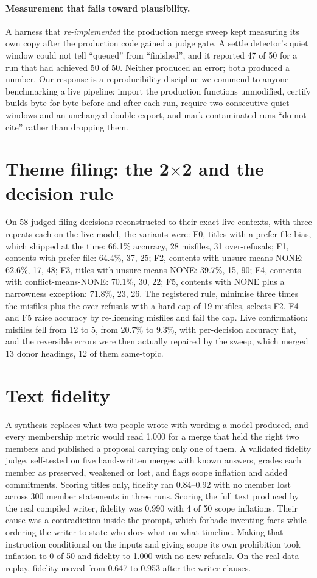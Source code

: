 \documentclass{article}
\begin{document}
\paragraph{Measurement that fails toward plausibility.} A harness that \emph{re-implemented} the production merge sweep kept measuring its own copy after the production code gained a judge gate. A settle detector's quiet window could not tell ``queued'' from ``finished'', and it reported 47 of 50 for a run that had achieved 50 of 50. Neither produced an error; both produced a number. Our response is a reproducibility discipline we commend to anyone benchmarking a live pipeline: import the production functions unmodified, certify builds byte for byte before and after each run, require two consecutive quiet windows and an unchanged double export, and mark contaminated runs ``do not cite'' rather than dropping them.

\section{Theme filing: the 2$\times$2 and the decision rule}
\label{app:filing}
On 58 judged filing decisions reconstructed to their exact live contexts, with three repeats each on the live model, the variants were: F0, titles with a prefer-file bias, which shipped at the time: 66.1\% accuracy, 28 misfiles, 31 over-refusals; F1, contents with prefer-file: 64.4\%, 37, 25; F2, contents with unsure-means-NONE: 62.6\%, 17, 48; F3, titles with unsure-means-NONE: 39.7\%, 15, 90; F4, contents with conflict-means-NONE: 70.1\%, 30, 22; F5, contents with NONE plus a narrowness exception: 71.8\%, 23, 26. The registered rule, minimise three times the misfiles plus the over-refusals with a hard cap of 19 misfiles, selects F2. F4 and F5 raise accuracy by re-licensing misfiles and fail the cap. Live confirmation: misfiles fell from 12 to 5, from 20.7\% to 9.3\%, with per-decision accuracy flat, and the reversible errors were then actually repaired by the sweep, which merged 13 donor headings, 12 of them same-topic.

\section{Text fidelity}
\label{app:fidelity}
A synthesis replaces what two people wrote with wording a model produced, and every membership metric would read 1.000 for a merge that held the right two members and published a proposal carrying only one of them. A validated fidelity judge, self-tested on five hand-written merges with known answers, grades each member as preserved, weakened or lost, and flags scope inflation and added commitments. Scoring titles only, fidelity ran 0.84--0.92 with no member lost across 300 member statements in three runs. Scoring the full text produced by the real compiled writer, fidelity was 0.990 with 4 of 50 scope inflations. Their cause was a contradiction inside the prompt, which forbade inventing facts while ordering the writer to state who does what on what timeline. Making that instruction conditional on the inputs and giving scope its own prohibition took inflation to 0 of 50 and fidelity to 1.000 with no new refusals. On the real-data replay, fidelity moved from 0.647 to 0.953 after the writer clauses.
\end{document}
